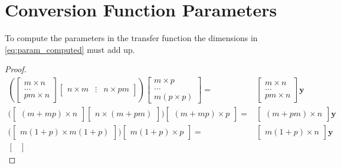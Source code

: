 \section{Conversion Function Parameters} %
\label{sec:conversion_function_parameters}
To compute the parameters in the transfer function the dimensions in \eqref{eq:param_computed} must add up.
\begin{proof}
\begin{equation*}
	\begin{split}
		\left(  
	\begin{bmatrix}
		m \times n \\
		\dots \\
		pm \times n
	\end{bmatrix}
	\begin{bmatrix}
		n \times m & \vdots & n\times pm
	\end{bmatrix} \right)
	\begin{bmatrix}
		m \times p \\
		\dots \\
		m \left(  p \times p \right)
	\end{bmatrix}
	= & 
	\begin{bmatrix}
		m \times n \\
		\dots \\
		pm \times n
	\end{bmatrix} \mathbf{y}\\ %
	\biggl( \begin{bmatrix}
		(m+mp) \times n 
	\end{bmatrix}
	\begin{bmatrix}
		n \times (m+pm)
	\end{bmatrix} \biggr) 
	\begin{bmatrix}
		(m+mp) \times p
	\end{bmatrix}
	= & 
	\begin{bmatrix}
		(m+pm) \times n 
	\end{bmatrix} \mathbf{y} \\ %
	\biggl( \begin{bmatrix}
		m(1+p) \times  m(1+p)
	\end{bmatrix} \biggr) 
	\begin{bmatrix}
		m (1+p) \times p 
	\end{bmatrix}
	= &
	\begin{bmatrix}
		m(1+p) \times n 
	\end{bmatrix} \mathbf{y} \\ %
	\begin{bmatrix}

\end{bmatrix}
\end{split}
\end{equation*}
\end{proof}
